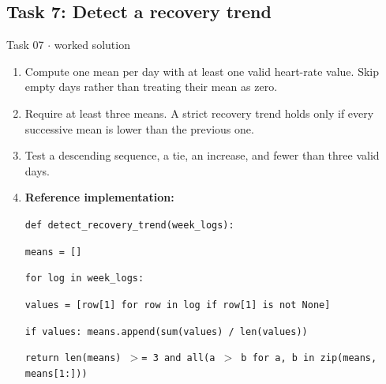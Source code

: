 \documentclass[11pt]{article}
\begin{document}
\begin{keepsection}\subsection{Task 7: Detect a recovery trend}

\begin{workedbox}{Task 07 \ensuremath{\cdot} worked solution}
\begin{enumerate}
\item Compute one mean per day with at least one valid heart-rate value. Skip empty days rather than treating their mean as zero.
\item Require at least three means. A strict recovery trend holds only if every successive mean is lower than the previous one.
\item Test a descending sequence, a tie, an increase, and fewer than three valid days.
\item {}
\textbf{Reference implementation:}
\begin{tcolorbox}[colback=Paperblue,colframe=Paperblue,boxrule=0pt,arc=0pt,left=7pt,right=7pt,top=5pt,bottom=5pt]\small\sloppy
\noindent\hspace*{0em}\texttt{def detect\_recovery\_trend(week\_logs):}\par
\noindent\hspace*{1em}\texttt{means = []}\par
\noindent\hspace*{1em}\texttt{for log in week\_logs:}\par
\noindent\hspace*{3em}\texttt{values = [row[1] for row in log if row[1] is not None]}\par
\noindent\hspace*{3em}\texttt{if values: means.append(sum(values) / len(values))}\par
\noindent\hspace*{1em}\texttt{return len(means) \ensuremath{>}= 3 and all(a \ensuremath{>} b for a, b in zip(means, means[1:]))}\par
\end{tcolorbox}
\end{enumerate}
\end{workedbox}

\end{keepsection}
\end{document}
